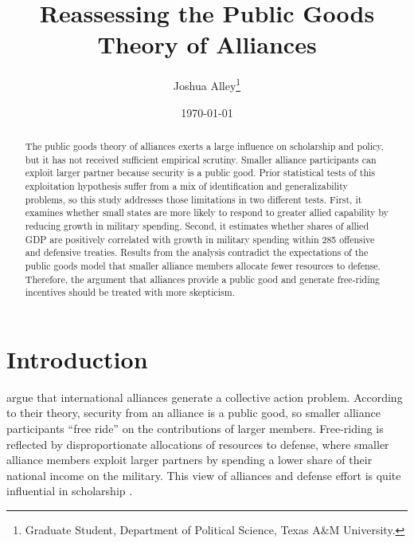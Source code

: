 \documentclass[12pt]{article}
\title{
\textbf{Reassessing the Public Goods Theory of Alliances}
	}
\author{Joshua Alley\footnote{Graduate Student,
Department of Political Science, Texas A\&M University.}}
\date{{\normalsize \today}}
\begin{document}
\maketitle 

\doublespace

\begin{abstract}
The public goods theory of alliances exerts a large influence on scholarship and policy, but it has not received sufficient empirical scrutiny. 
Smaller alliance participants can exploit larger partner because security is a public good. 
Prior statistical tests of this exploitation hypothesis suffer from a mix of identification and generalizability problems, so this study addresses those limitations in two different tests. 
First, it examines whether small states are more likely to respond to greater allied capability by reducing growth in military spending. 
Second, it estimates whether shares of allied GDP are positively correlated with growth in military spending within 285 offensive and defensive treaties. 
Results from the analysis contradict the expectations of the public goods model that smaller alliance members allocate fewer resources to defense. 
Therefore, the argument that alliances provide a public good and generate free-riding incentives should be treated with more skepticism. 

\end{abstract} 

\newpage


\section{Introduction}



\citet{OlsonZeckhauser1966} argue that international alliances generate a collective action problem. 
According to their theory, security from an alliance is a public good, so smaller alliance participants ``free ride'' on the contributions of larger members. 
Free-riding is reflected by disproportionate allocations of resources to defense, where smaller alliance members exploit larger partners by spending a lower share of their national income on the military.
This view of alliances and defense effort is quite influential in scholarship \citep{Walt1990, Mearsheimer1994, Goldstein1995, SandlerHartley2001, Garfinkel2004, Walt2009, Norrlof2010, Barrett2010, PluemperNeumayer2015}. 
\end{document}

